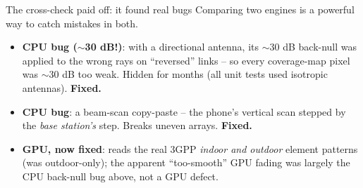 \documentclass[aspectratio=169,11pt]{beamer}
\begin{document}
\begin{frame}{The cross-check paid off: it found real bugs}
  Comparing two engines is a powerful way to catch mistakes \alert{in both}.
  \begin{itemize}
    \item \textcolor{cpuCol}{\textbf{CPU bug ($\sim$30 dB!)}}: with a directional
          antenna, its $\sim$30 dB back-null was applied to the wrong rays on
          ``reversed'' links -- so \alert{every} coverage-map pixel was $\sim$30 dB
          too weak. Hidden for months (all unit tests used isotropic antennas).
          \textbf{Fixed.}
    \item \textcolor{cpuCol}{\textbf{CPU bug}}: a beam-scan copy-paste -- the
          phone's vertical scan stepped by the \emph{base station's} step.
          Breaks uneven arrays. \textbf{Fixed.}
    \item \textcolor{gpuCol}{\textbf{GPU, now fixed}}: reads the real 3GPP
          \emph{indoor and outdoor} element patterns (was outdoor-only); the
          apparent ``too-smooth'' GPU fading was largely the CPU back-null bug
          above, not a GPU defect.
  \end{itemize}
\end{frame}
\end{document}
